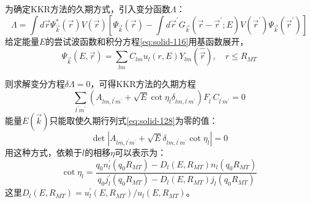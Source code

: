 为确定KKR方法的久期方式，引入变分函数$\Lambda$：
\begin{equation}
  \Lambda=\int d\vec r\Psi_{\vec k}^{\ast}(\vec r)V(\vec r)\left[\Psi_{\vec k}(\vec r)-\int d\vec r^{\prime}G_{\vec k}(\vec r-\vec r^{\prime};E)V(\vec r^{\prime})\Psi_{\vec k}(\vec r^{\prime})\right]
  \label{eq:solid-122}
\end{equation}
给定能量$E$的尝试波函数和积分方程\eqref{eq:solid-116}用基函数展开，\begin{equation}
  \Psi_{\vec k}(E,\vec r)=\sum_{lm}C_{lm}u_l(r,E)Y_{lm}(\hat{\vec r}),\quad r\leqslant R_{MT}
  \label{eq:solid-123}
\end{equation}


则求解变分方程$\delta\Lambda=0$\cite{PR94-1111_1954}，可得KKR方法的久期方程
\begin{equation}
  \sum_{l^{\prime}m^{\prime}}(A_{lm,l^{\prime}m^{\prime}}+\sqrt E\cot\eta_l\delta_{lm,l^{\prime}m^{\prime}})F_{l^{\prime}}C_{l^{\prime}m^{\prime}}=0
  \label{eq:solid-127}
\end{equation}
能量$E(\vec k)$只能取使久期行列式\eqref{eq:solid-128}为零的值：
\begin{equation}
  \det|A_{lm,l^{\prime}m^{\prime}}+\sqrt E\delta_{lm,l^{\prime}m^{\prime}}\cot\eta_l|=0
  \label{eq:solid-128}
\end{equation}
用这种方式，依赖于$l$的相移$\eta$可以表示为：
\begin{equation}
  \cot\eta_l=\dfrac{q_0n_l^{\prime}(q_0R_{MT})-D_l(E,R_{MT})n_l(q_0R_{MT})}{q_0j_l^{\prime}(q_0R_{MT})-D_l(E,R_{MT})j_l(q_0R_{MT})}
  \label{eq:solid-129}
\end{equation}
这里$D_l(E,R_{MT})=u_l^{\prime}(E,R_{MT})/u_l(E,R_{MT})$。

